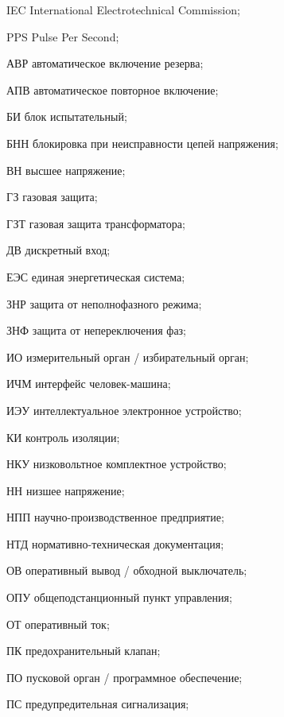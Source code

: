 \begin{list}{}%
{%
  \setlength{\labelwidth}{\abbrwidth}%
  \setlength{\labelsep}{0pt}%
  \setlength{\leftmargin}{\dimexpr\labelwidth+\labelsep\relax}%
  \setlength{\itemindent}{0pt}%
  \setlength{\parsep}{0pt}%
  \setlength{\itemsep}{0pt}
  \renewcommand{\makelabel}[1]{#1 --\hspace{\abbrgap}}%
}
\item[IEC]  International Electrotechnical Commission;
\item[PPS] Pulse Per Second;
\item[АВР] автоматическое включение резерва;
\item[АПВ] автоматическое повторное включение;
\item[БИ] блок испытательный;
\item[БНН] блокировка при неисправности цепей напряжения;
\item[ВН] высшее напряжение;
\item[ГЗ] газовая защита;
\item[ГЗТ] газовая защита трансформатора;
\item[ДВ] дискретный вход;
\item[ЕЭС] единая энергетическая система;
\item[ЗНР] защита от неполнофазного режима;
\item[ЗНФ] защита от непереключения фаз;
\item[ИО] измерительный орган / избирательный орган;
\item[ИЧМ] интерфейс человек-машина;
\item[ИЭУ] интеллектуальное электронное устройство;
\item[КИ] контроль изоляции;
\item[НКУ] низковольтное комплектное устройство;
\item[НН] низшее напряжение;
\item[НПП] научно-производственное предприятие;
\item[НТД] нормативно-техническая документация;
\item[ОВ] оперативный вывод / обходной выключатель;
\item[ОПУ] общеподстанционный пункт управления;
\item[ОТ] оперативный ток;
\item[ПК] предохранительный клапан;
\item[ПО] пусковой орган / программное обеспечение;
\item[ПС] предупредительная сигнализация;

\end{list}
